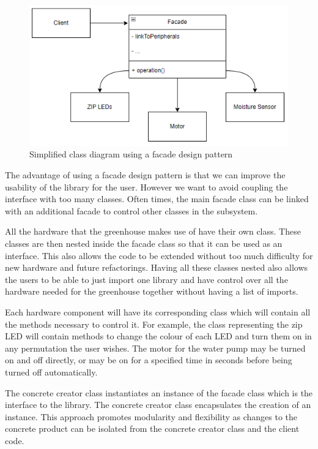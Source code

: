 \begin{figure}[ht]
    \centering
    \includegraphics{Report/Images/facadePattern.png}
    \caption{Simplified class diagram using a facade design pattern}
    \label{fig:classDiagram}
\end{figure}

The advantage of using a facade design pattern is that we can improve the usability of the library for the user.  However we want to avoid coupling the interface with too many classes. Often times, the main facade class can be linked with an additional facade to control other classes in the subsystem. \cite{designPatterns}

All the hardware that the greenhouse makes use of have their own class. These classes are then nested inside the facade class so that it can be used as an interface. This also allows the code to be extended without too much difficulty for new hardware and future refactorings. Having all these classes nested also allows the users to be able to just import one library and have control over all the hardware needed for the greenhouse together without having a list of imports.

Each hardware component will have its corresponding class which will contain all the methods necessary to control it. For example, the class representing the zip LED will contain methods to change the colour of each LED and turn them on in any permutation the user wishes. The motor for the water pump may be turned on and off directly, or may be on for a specified time in seconds before being turned off automatically.

The concrete creator class instantiates an instance of the facade class which is the interface to the library. The concrete creator class encapsulates the creation of an instance. This approach promotes modularity and flexibility as changes to the concrete product can be isolated from the concrete creator class and the client code.
